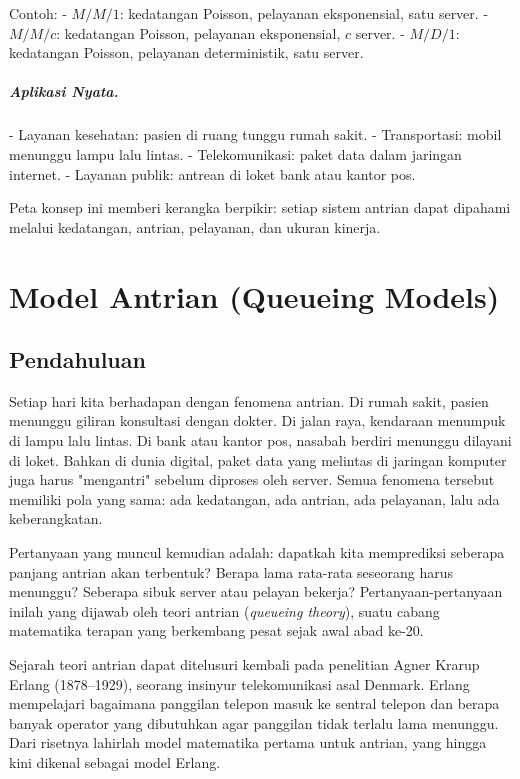 \documentclass{bukumjh}
\begin{document}
Contoh:
- $M/M/1$: kedatangan Poisson, pelayanan eksponensial, satu server.  
- $M/M/c$: kedatangan Poisson, pelayanan eksponensial, $c$ server.  
- $M/D/1$: kedatangan Poisson, pelayanan deterministik, satu server.  

\paragraph{Aplikasi Nyata.}  
- Layanan kesehatan: pasien di ruang tunggu rumah sakit.  
- Transportasi: mobil menunggu lampu lalu lintas.  
- Telekomunikasi: paket data dalam jaringan internet.  
- Layanan publik: antrean di loket bank atau kantor pos.  

Peta konsep ini memberi kerangka berpikir: setiap sistem antrian dapat dipahami melalui kedatangan, antrian, pelayanan, dan ukuran kinerja.

\chapter{Model Antrian (Queueing Models)}

\section{Pendahuluan}

Setiap hari kita berhadapan dengan fenomena antrian. Di rumah sakit, pasien menunggu giliran konsultasi dengan dokter. Di jalan raya, kendaraan menumpuk di lampu lalu lintas. Di bank atau kantor pos, nasabah berdiri menunggu dilayani di loket. Bahkan di dunia digital, paket data yang melintas di jaringan komputer juga harus "mengantri" sebelum diproses oleh server. Semua fenomena tersebut memiliki pola yang sama: {\jsg ada kedatangan, ada antrian, ada pelayanan, lalu ada keberangkatan}.

Pertanyaan yang muncul kemudian adalah: dapatkah kita memprediksi seberapa panjang antrian akan terbentuk? Berapa lama rata-rata seseorang harus menunggu? Seberapa sibuk server atau pelayan bekerja? Pertanyaan-pertanyaan inilah yang dijawab oleh {\jsg teori antrian} (\textit{queueing theory}), suatu cabang matematika terapan yang berkembang pesat sejak awal abad ke-20.

Sejarah teori antrian dapat ditelusuri kembali pada penelitian Agner Krarup Erlang (1878–1929), seorang insinyur telekomunikasi asal Denmark. Erlang mempelajari bagaimana panggilan telepon masuk ke sentral telepon dan berapa banyak operator yang dibutuhkan agar panggilan tidak terlalu lama menunggu. Dari risetnya lahirlah model matematika pertama untuk antrian, yang hingga kini dikenal sebagai model Erlang.
\end{document}
